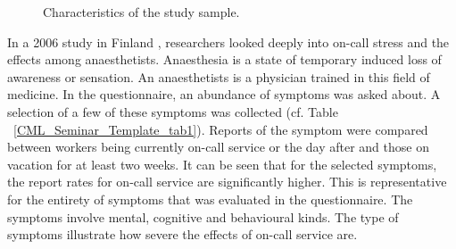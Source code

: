 \documentclass{CML_Seminar_Template}
\begin{document}
\begin{figure}[htb]
  \begin{center}
  \end{center}
    \caption{\label{study_sample}  Characteristics of the study sample. \cite[]{heponiemi2014call}}
\end{figure}

\par
In a 2006 study in Finland \cite[]{Lindfors2006}, researchers looked deeply into on-call stress and the effects among anaesthetists. Anaesthesia is a state of temporary induced loss of awareness or sensation. An anaesthetists is a physician trained in this field of medicine. In the questionnaire, an abundance of symptoms was asked about. A selection of a few of these symptoms was collected (cf. Table ~\ref{CML_Seminar_Template_tab1}). Reports of the symptom were compared between workers being currently on-call service or the day after and those on vacation for at least two weeks. It can be seen that for the selected symptoms, the report rates for on-call service are significantly higher. This is representative for the entirety of symptoms that was evaluated in the questionnaire. The symptoms involve mental, cognitive and behavioural kinds. The type of symptoms illustrate how severe the effects of on-call service are.
\end{document}
